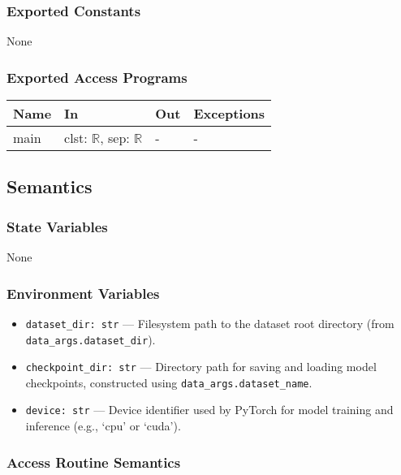 \documentclass[12pt, titlepage]{article}
\begin{document}
\subsubsection{Exported Constants}
None

\subsubsection{Exported Access Programs}
\begin{center}
\begin{tabular}{p{3cm} p{6cm} p{4.5cm} p{3cm}}
\hline
\textbf{Name} & \textbf{In} & \textbf{Out} & \textbf{Exceptions} \\
\hline
main & clst: \(\mathbb{R}\), sep: \(\mathbb{R}\) & - & - \\
\hline
\end{tabular}
\end{center}

\subsection{Semantics}

\subsubsection{State Variables}
None

\subsubsection{Environment Variables}
\begin{itemize}
  \item \texttt{dataset\_dir: str} — Filesystem path to the dataset root directory (from \texttt{data\_args.dataset\_dir}).
  \item \texttt{checkpoint\_dir: str} — Directory path for saving and loading model checkpoints, constructed using \texttt{data\_args.dataset\_name}.
  \item \texttt{device: str} — Device identifier used by PyTorch for model training and inference (e.g., `cpu' or `cuda').
\end{itemize}

\subsubsection{Access Routine Semantics}
\end{document}
